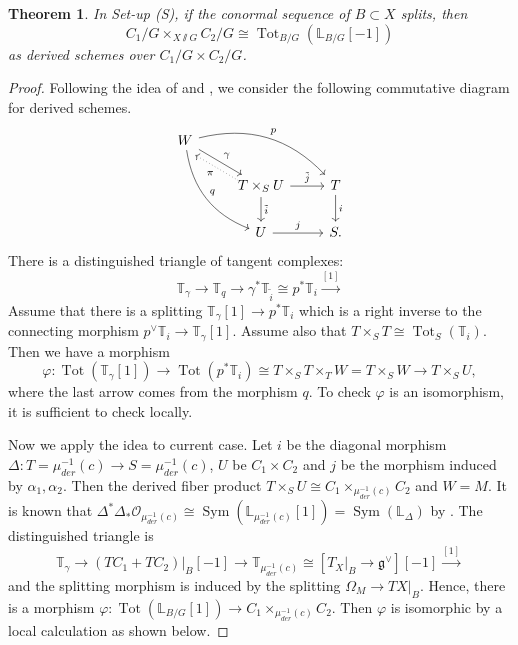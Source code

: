 \documentclass[12pt]{amsart}
\newtheorem{theorem}{Theorem}[section]
\theoremstyle{definition}
\theoremstyle{remark}
\numberwithin{equation}{section}
\newcommand{\LL}{\mathbb{L}}
\newcommand{\TT}{\mathbb{T}}
\newcommand{\shO}{\mathcal{O}}
\newcommand{\Sym}{\operatorname{Sym}}
\newcommand{\Tot}{\operatorname{Tot}}
\newcommand{\arw}{\longrightarrow}
\begin{document}
\begin{theorem}\label{mainthm}
In Set-up (S), if the conormal sequence of $B\subset X$ splits, then 
$$C_1/G\times_{X\sslash  G} C_2/G\cong \Tot_{B/G}(\LL_{B/G}[-1])$$
as derived schemes over $C_1/G\times C_2/G$.
\end{theorem}
\begin{proof}
Following the idea of \cite{arinkin2012self} and \cite{arinkin2019formality}, we consider the following commutative diagram for derived schemes. 
\begin{equation*}
   \begin{tikzcd}
    W 
    \arrow[drr, bend left,"p"] \arrow[ddr, bend right, "q"] \arrow[dr, "\gamma"] &&\\
    & T\times_S U\arrow[r,"\tilde{j}"] \arrow[d,"\tilde{i}"]\arrow[ul, dotted, shift left=2, "\pi"]
& T \arrow[d, "i"] \\
 & U \arrow[r, "j"]
& S.
   \end{tikzcd}
  \end{equation*}
There is a distinguished triangle of tangent complexes:
$$\TT_{\gamma}\arw \TT_q\arw \gamma^{*}\TT_{\tilde{i}}\cong p^{*}\TT_i\xrightarrow{[1]}$$
Assume that there is a splitting $\TT_{\gamma}[1]\arw p^{*}\TT_i$ which is a right inverse to the connecting morphism $p^{\vee}\TT_i\arw \TT_{\gamma}[1]$. 
Assume also that  $T\times_S T\cong \Tot_S(\TT_i)$. Then we have a morphism
$$ \varphi: \Tot(\TT_{\gamma}[1])\arw \Tot(p^{*}\TT_i)\cong T\times_S T\times_T W=T\times_S W\arw T\times_S U,$$
where the last arrow comes from the morphism $q$. 
To check $\varphi$ is an isomorphism, it is sufficient to check locally. 

Now we apply the idea to current case. Let $i$ be the diagonal morphism $\Delta: T=\mu_{der}^{-1}(c) \arw S=\mu_{der}^{-1}(c)$, $U$ be $C_1\times C_2$ and $j$ be the morphism induced by $\alpha_1, \alpha_2$. Then the derived fiber product $T\times_S U\cong C_1\times_{\mu_{der}^{-1}(c)} C_2$ and $W=M$. It is known that $\Delta^{*}\Delta_* \shO_{\mu_{der}^{-1}(c)}\cong \Sym (\LL_{\mu_{der}^{-1}(c)}[1])=\Sym (\LL_{\Delta})$ by \cite[Proposition 1.1]{ben2012loop}. The distinguished triangle is
$$ \TT_{\gamma}\arw (TC_1+TC_2)|_B[-1] \arw \TT_{\mu_{der}^{-1}(c)}\cong [T_X|_B\arw \mathfrak{g}^{\vee}][-1] \xrightarrow{[1]}$$
and the splitting morphism is induced by the splitting $\Omega_M\arw TX|_B$. Hence, there is a morphism
$\varphi: \Tot(\LL_{B/G}[1])\arw C_1\times_{\mu_{der}^{-1}(c)} C_2$. Then $\varphi$ is isomorphic by a local calculation as shown below.   


\end{proof}
\end{document}
